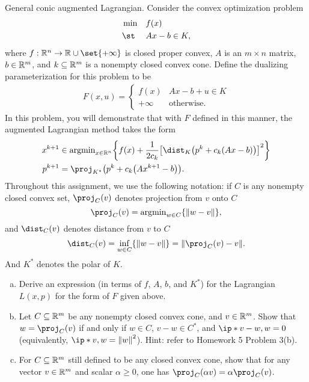 \documentclass{article}
\begin{document}
\begin{problem}
    {General conic augmented Lagrangian.}
    Consider the convex optimization problem
    \begin{align}
        \label{eq:1}
        \begin{aligned}
            &\min && f(x) \\
            &\st && Ax-b \in K,
        \end{aligned}
    \end{align}
    where $f:\R^n\rightarrow\R\cup\set{+\infty}$ is closed proper convex, $A$ is an $m\times n$ matrix, $b\in\mathbb{R}^m$, and $k\subseteq \mathbb{R}^m$ is a nonempty closed convex cone. Define the dualizing parameterization for this problem to be
    \begin{align}
        \label{eq:2}
        F(x, u) = {
            \begin{cases}
                f(x) & Ax-b+u\in K \\
                +\infty & \text{otherwise}.
            \end{cases}
        }
    \end{align}
    In this problem, you will demonstrate that with $F$ defined in this manner, the augmented Lagrangian method takes the form
    \begin{align}
        x^{k+1} & \in \argmin_{x\in\R^n} \braces*{f(x) + \frac{1}{2c_k}\bracks*{\dist_K\parens*{p^k+c_k\parens*{Ax-b}}}^2} \label{eq:3} \\
        p^{k+1} &= \proj_{K^*}\parens*{p^k+c_k\parens*{Ax^{k+1}-b}}. \label{eq:4}
    \end{align}
    Throughout this assignment, we use the following notation: if $C$ is any nonempty closed convex set, $\proj_C(v)$ denotes projection from $v$ onto $C$
    \[\proj_C(v)=\argmin_{w\in C}\braces*{\norm*{w-v}},\]
    and $\dist_C(v)$ denotes distance from $v$ to $C$
    \[\dist_C(v)=\inf_{w\in C}\braces*{\norm*{w-v}}=\norm*{\proj_C(v)-v}.\]
    And $K^*$ denotes the polar of $K$.
    \begin{enumerate}[(a)]
        \item Derive an expression (in terms of $f$, $A$, $b$, and $K^*$) for the Lagrangian $L(x, p)$ for the form of $F$ given above.
        \item Let $C\subseteq \mathbb{R}^m$ be any nonempty closed convex cone, and $v\in\mathbb{R}^m$. Show that $w=\proj_C(v)$ if and only if $w\in C$, $v-w\in C^*$, and $\ip*{v-w, w} = 0$ (equivalently, $\ip*{v, w}=\norm*{w}^2$). Hint: refer to Homework 5 Problem 3(b).
        \item For $C\subseteq \mathbb{R}^m$ still defined to be any closed convex cone, show that for any vector $v\in\mathbb{R}^m$ and scalar $\alpha \geq 0$, one has $\proj_C(\alpha v)=\alpha \proj_C(v)$.

\end{enumerate}
\end{problem}
\end{document}
